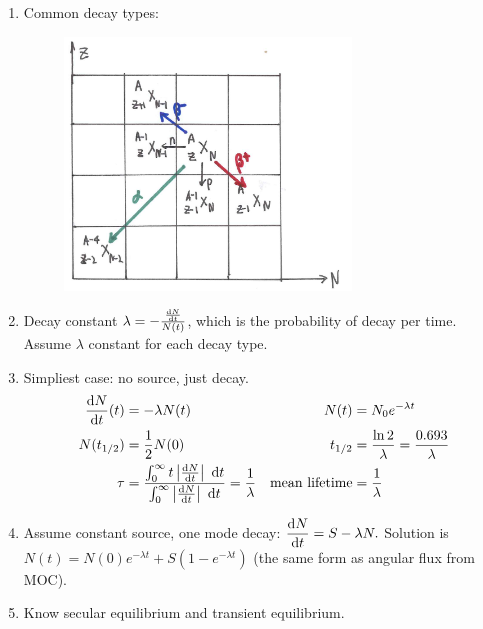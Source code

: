 \documentclass{school-22.101-notes}
\begin{document}
\clearpage
\begin{enumerate}
\item Common decay types:
    \begin{figure}[h!]
        \centering
        \includegraphics[width=3in]{images/rd/Z-N-grid.png}
    \end{figure}

\item Decay constant $\lambda = -\frac{\frac{\mathrm{d}N}{\mathrm{d}t}}{N(t)}$, which is the probability of decay per time. Assume $\lambda$ constant for each decay type. 

\item Simpliest case: no source, just decay. 
    \begin{align}
    \frac{\mathrm{d}N}{\mathrm{d}t} (t) &= - \lambda N(t) &  N(t) &= N_0 e^{-\lambda  t} \\
    N(t_{1/2}) &= \frac{1}{2} N(0) & t_{1/2} &= \frac{\ln 2}{\lambda} = \frac{0.693}{\lambda} \\
    \tau &= \frac{\int_0^{\infty} t \left| \frac{\mathrm{d}N}{\mathrm{d}t} \right| \mbox{ }\mathrm{d} t }{\int_0^{\infty}  \left| \frac{\mathrm{d}N}{\mathrm{d}t} \right| \mbox{ }\mathrm{d} t} = \frac{1}{\lambda} & \mbox{mean lifetime} &= \frac{1}{\lambda}
    \end{align}

\item Assume constant source, one mode decay: $\displaystyle \frac{\mathrm{d}N}{\mathrm{d}t} = S - \lambda N.$ Solution is $N(t) = N(0) e^{-\lambda t} + S(1 - e^{-\lambda t})$ (the same form as angular flux from MOC). 

\item Know secular equilibrium and transient equilibrium. 


\end{enumerate}
\end{document}
